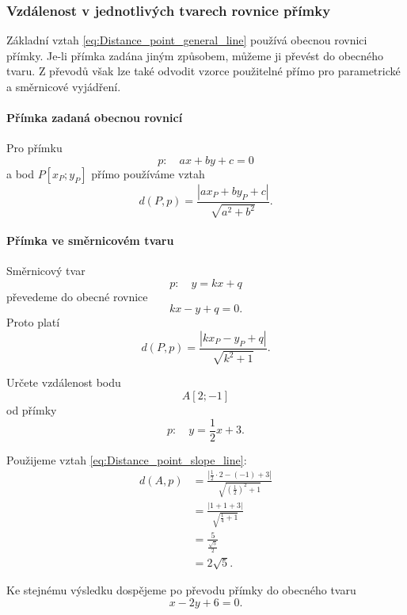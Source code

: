 \subsubsection{Vzdálenost v jednotlivých tvarech rovnice přímky}
\label{subsubsec:Distance_point_line_forms}

Základní vztah \eqref{eq:Distance_point_general_line} používá obecnou
rovnici přímky. Je-li přímka zadána jiným způsobem, můžeme ji převést
do obecného tvaru. Z převodů však lze také odvodit vzorce použitelné
přímo pro parametrické a směrnicové vyjádření.

\paragraph{Přímka zadaná obecnou rovnicí}

Pro přímku
\[
    p:\quad ax+by+c=0
\]
a bod $P[x_P;y_P]$ přímo používáme vztah
\[
    d(P,p)
    =
    \frac{|ax_P+by_P+c|}{\sqrt{a^2+b^2}}.
\]

\paragraph{Přímka ve směrnicovém tvaru}

Směrnicový tvar
\[
    p:\quad y=kx+q
\]
převedeme do obecné rovnice
\[
    kx-y+q=0.
\]
Proto platí
\begin{equation}\label{eq:Distance_point_slope_line}
    d(P,p)
    =
    \frac{|kx_P-y_P+q|}{\sqrt{k^2+1}}.
\end{equation}

\begin{example}\label{exa:Distance_point_slope_line}
    Určete vzdálenost bodu
    \[
        A[2;-1]
    \]
    od přímky
    \[
        p:\quad y=\frac12x+3.
    \]

    Použijeme vztah \eqref{eq:Distance_point_slope_line}:
    \begin{align*}
        d(A,p)
        &=
        \frac{
            \left|
                \frac12\cdot2-(-1)+3
            \right|
        }
        {\sqrt{\left(\frac12\right)^2+1}}\\
        &=
        \frac{|1+1+3|}{\sqrt{\frac14+1}}\\
        &=
        \frac{5}{\frac{\sqrt5}{2}}\\
        &=
        2\sqrt5.
    \end{align*}

    Ke stejnému výsledku dospějeme po převodu přímky do obecného
    tvaru
    \[
        x-2y+6=0.
    \]
\end{example}

